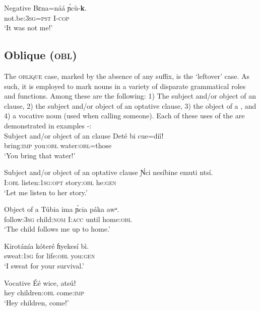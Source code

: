 Negative  
\ea\label{ex:case:41}
\gll Bɛna=náá     \'{ɲ}cù-\textbf{k\ᵒ}. \\
not.be:\textsc{3sg}=\textsc{pst}   I-\textsc{cop}    \\
\glt ‘It was not me!’ 
\z






\subsection{Oblique (\textsc{obl})}\label{sec:7.9}


The \textsc{oblique} case, marked by the absence of any suffix, is the ‘leftover’ case. As such, it is employed to mark nouns in a variety of disparate grammatical roles and functions. Among these are the following: 1) The subject and/or object of an  clause, 2) the subject and/or object of an optative clause, 3) the object of a , and 4) a vocative noun (used when calling someone). Each of these uses of the  are demonstrated in examples -:\\




Subject and/or object of an  clause
\ea\label{ex:case:42}
\gll Deté     bi     cue=dííǃ \\
bring:\textsc{imp}   you:\textsc{obl}   water:\textsc{obl}=those    \\
\glt ‘You bring that water!’ 
\z

Subject and/or object of an optative clause
\ea\label{ex:case:43}
\gll \'{Ɲ}ci   nesíbine     emuti     ntsí. \\
I:\textsc{obl}   listen:\textsc{1sg:opt}   story:\textsc{obl}   he:\textsc{gen}    \\
\glt ‘Let me listen to her story.’ 
\z




Object of a 
\ea\label{ex:case:44}
\gll Túbia     ima     \'{ɲ}cia   páka   awᵃ. \\
follow:\textsc{3sg}   child:\textsc{nom}   I:\textsc{acc}   until   home:\textsc{obl}    \\
\glt ‘The child follows me up to home.’ 
\z




\ea\label{ex:case:45}
\gll Kirotánía  kóteré   ɦyekesí   bì. \\
sweat:\textsc{1sg}   for     life:\textsc{obl}   you:\textsc{gen}    \\
\glt ‘I sweat for your survival.’ 
\z





Vocative
\ea\label{ex:case:46}
\gll Éé   wice,     atsúǃ \\
hey   children:\textsc{obl}  come:\textsc{imp}    \\
\glt ‘Hey children, come!’ 
\z




